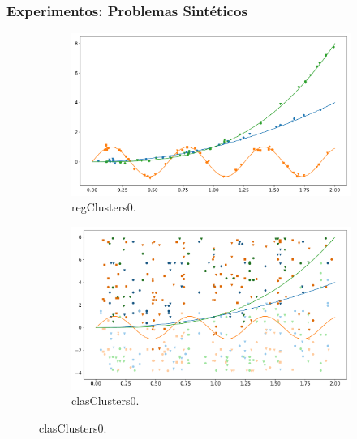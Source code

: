 \documentclass[aspectratio=43]{beamer}
\newcommand{\fdata}[1]{\textsf{#1}}
\begin{document}
\begin{frame}
      \frametitle{Experimentos: Problemas Sintéticos}

      \begin{figure}
      \begin{subfigure}[b]{0.49\textwidth}
            \centering
            \includegraphics[width=\textwidth]{Chapter6/IGPL2022/regClusters__0.pdf}
            \caption{\fdata{regClusters0}.}
      \end{subfigure}
      \hfill
      \begin{subfigure}[b]{0.49\textwidth}
            \centering
            \includegraphics[width=\textwidth]{Chapter6/IGPL2022/clasClusters__0.pdf}
            \caption{\fdata{clasClusters0}.}
      \end{subfigure}
      \end{figure}

\end{frame}
\end{document}
